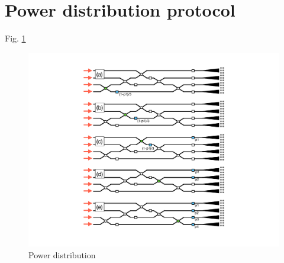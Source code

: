 \documentclass[%
 reprint,
 amsmath,amssymb,
 aps,
prstab,
floatfix,
]{revtex4-1}
\begin{document}

\section{\label{sec:power}Power distribution protocol}

%

Fig. \ref{fig:power}

\begin{figure}
\includegraphics[width=0.8\columnwidth]{amplitude_tuning}
\caption{\label{fig:power} Power distribution}
\end{figure}
\end{document}
